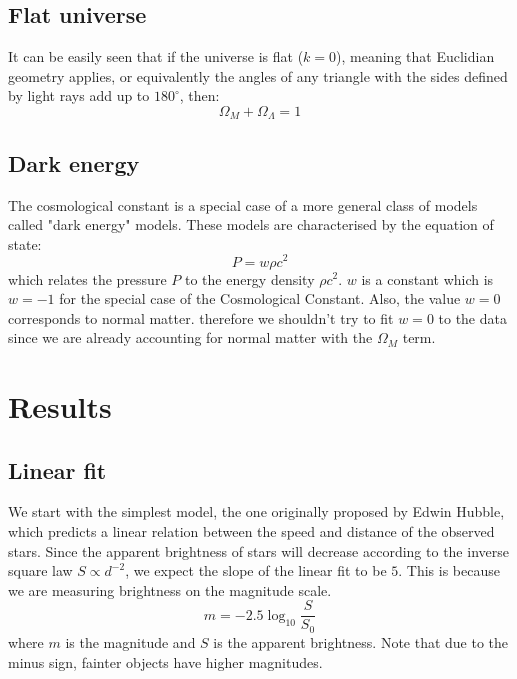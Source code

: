 \documentclass[11pt]{article}
\begin{document}
\subsection{Flat universe}
It can be easily seen that if the universe is flat ($k = 0$), meaning that Euclidian geometry applies, or equivalently the angles of any triangle with the sides defined by light rays add up to $180^\circ$, then: 
\begin{equation}
	\Omega_M + \Omega_\Lambda = 1
	\label{eq:flat}
\end{equation}

\subsection{Dark energy}
The cosmological constant is a special case of a more general class of models called "dark energy" models. These models are characterised by the equation of state:
\begin{equation}
	P = w \rho c^2
	\label{eq:dark}
\end{equation}
which relates the pressure $P$ to the energy density $\rho c^2$. $w$ is a constant which is $w = -1$ for the special case of the Cosmological Constant. Also, the value $w = 0$ corresponds to normal matter. therefore we shouldn't try to fit $w = 0$ to the data since we are already accounting for normal matter with the $\Omega_M$ term. 

\section{Results}
\subsection{Linear fit}
We start with the simplest model, the one originally proposed by Edwin Hubble, which predicts a linear relation between the speed and distance of the observed stars. Since the apparent brightness of stars will decrease according to the inverse square law $S \propto d^{-2}$, we expect the slope of the linear fit to be $5$. This is because we are measuring brightness on the magnitude scale.
\begin{equation}
	m = -2.5\log_{10}\frac{S}{S_0}
	\label{eq:mag}
\end{equation}
where $m$ is the magnitude and  $S$ is the apparent brightness. Note that due to the minus sign, fainter objects have higher magnitudes. 
\end{document}
